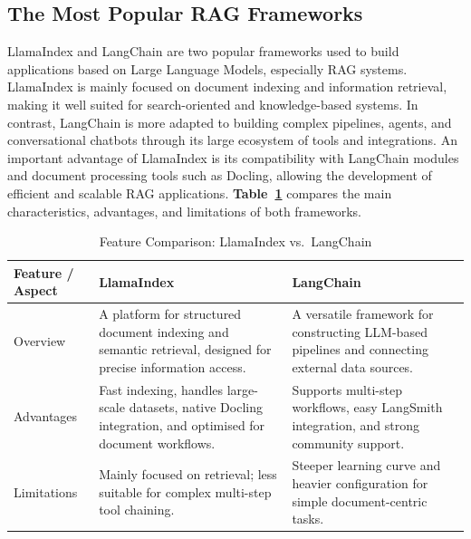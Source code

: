 \subsection{The Most Popular RAG Frameworks}
LlamaIndex \cite{llamaindex} and LangChain \cite{langchain} are two popular frameworks used to build
applications based on Large Language Models, especially RAG systems.
LlamaIndex is mainly focused on document indexing and information retrieval,
making it well suited for search-oriented and knowledge-based systems.
In contrast, LangChain is more adapted to building complex pipelines,
agents, and conversational chatbots through its large ecosystem of tools
and integrations. An important advantage of LlamaIndex is its compatibility
with LangChain modules and document processing tools such as Docling,
allowing the development of efficient and scalable RAG applications.
\textbf{Table~\ref{tab:llama_langchain}} compares the main characteristics,
advantages, and limitations of both frameworks.

\begin{table}[H]
\centering
\caption{Feature Comparison: LlamaIndex vs.\ LangChain}
\label{tab:llama_langchain}
\renewcommand{\arraystretch}{1.5}
\begin{tabular}{|p{4cm}|p{5.5cm}|p{5.5cm}|}
\hline
\textbf{Feature / Aspect} & \textbf{LlamaIndex} & \textbf{LangChain} \\
\hline

Overview &
A platform for structured document indexing and semantic retrieval,
designed for precise information access. &
A versatile framework for constructing LLM-based pipelines and
connecting external data sources. \\
\hline

Advantages &
Fast indexing, handles large-scale datasets, native Docling integration,
and optimised for document workflows. &
Supports multi-step workflows, easy LangSmith integration,
and strong community support. \\
\hline

Limitations &
Mainly focused on retrieval; less suitable for complex multi-step
tool chaining. &
Steeper learning curve and heavier configuration for simple
document-centric tasks. \\
\hline

\end{tabular}
\end{table}

